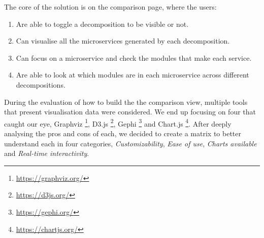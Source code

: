 The core of the solution is on the comparison page, where the users:

\begin{enumerate}
  \item Are able to toggle a decomposition to be visible or not.
  \item Can visualise all the microservices generated by each decomposition.
  \item Can focus on a microservice and check the modules that make each service.
  \item Are able to look at which modules are in each microservice across different decompositions.
\end{enumerate}

During the evaluation of how to build the the comparison view, multiple tools that present visualisation data were considered. We end up focusing on four that caught our eye, Graphviz \footnote{\url{https://graphviz.org/}}, D3.js \footnote{\url{https://d3js.org/}}, Gephi \footnote{\url{https://gephi.org/}} and Chart.js \footnote{\url{https://chartjs.org/}}. After deeply analysing the pros and cons of each, we decided to create a matrix to better understand each in four categories, \textit{Customizability}, \textit{Ease of use}, \textit{Charts available} and \textit{Real-time interactivity}.

